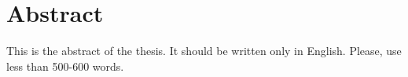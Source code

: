 \section*{\Large Abstract}
This is the abstract of the thesis. It should be written only in English.  Please, use less
than 500-600 words.

\cleardoublepage